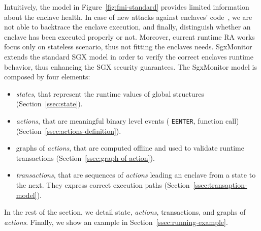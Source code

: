 Intuitively, the model in Figure~\ref{fig:fmi-standard} provides limited
information about the enclave health. In case of new attacks against enclaves'
code~\citep{lee2017hacking,biondo2018guard,snakegx}, we are not able to
backtrace the enclave execution, and finally, distinguish whether an
enclave has been executed properly or not.
Moreover, current runtime RA works~\citep{abera2016c,aberadiat,scarr} focus 
only 
on stateless scenario, thus not fitting the enclaves needs.
SgxMonitor extends the standard SGX model in order to verify the correct 
enclaves runtime behavior, thus enhancing the SGX security guarantees.
The SgxMonitor model is composed by four elements:
\begin{itemize}
	\item \emph{states}, that represent the runtime values of global structures	
	(Section~\ref{ssec:state}).
	\item \emph{actions}, that are meaningful binary level events (\eg 
	\texttt{EENTER}, function call) (Section~\ref{ssec:actions-definition}).
	\item graphs of \emph{actions}, that are computed offline and used to 
	validate runtime transactions (Section~\ref{ssec:graph-of-action}).
	\item \emph{transactions}, that are sequences of \emph{actions} leading an 
	enclave from a state to the next. They express correct execution paths 
	(Section~\ref{ssec:transaption-model}).
\end{itemize}
In the rest of the section, we detail state, \emph{actions}, transactions, and 
graphs of \emph{actions}. Finally, we show an example in 
Section~\ref{ssec:running-example}.


